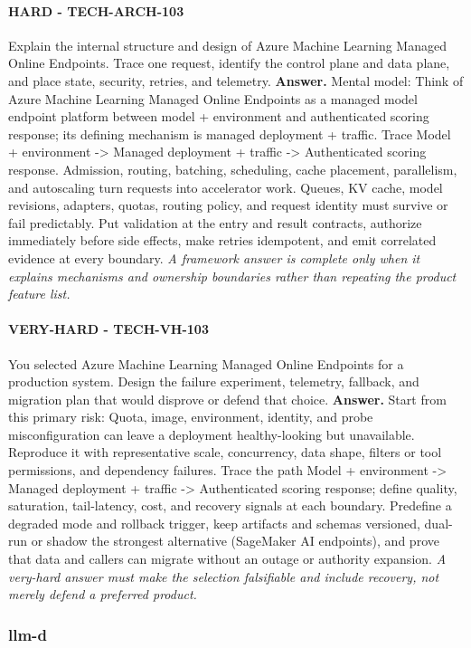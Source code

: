 \paragraph{HARD - TECH-ARCH-103} Explain the internal structure and design of Azure Machine Learning Managed Online Endpoints. Trace one request, identify the control plane and data plane, and place state, security, retries, and telemetry.
\textbf{Answer.} Mental model: Think of Azure Machine Learning Managed Online Endpoints as a managed model endpoint platform between model + environment and authenticated scoring response; its defining mechanism is managed deployment + traffic. Trace Model + environment -> Managed deployment + traffic -> Authenticated scoring response. Admission, routing, batching, scheduling, cache placement, parallelism, and autoscaling turn requests into accelerator work. Queues, KV cache, model revisions, adapters, quotas, routing policy, and request identity must survive or fail predictably. Put validation at the entry and result contracts, authorize immediately before side effects, make retries idempotent, and emit correlated evidence at every boundary.
\textit{A framework answer is complete only when it explains mechanisms and ownership boundaries rather than repeating the product feature list.}
\paragraph{VERY-HARD - TECH-VH-103} You selected Azure Machine Learning Managed Online Endpoints for a production system. Design the failure experiment, telemetry, fallback, and migration plan that would disprove or defend that choice.
\textbf{Answer.} Start from this primary risk: Quota, image, environment, identity, and probe misconfiguration can leave a deployment healthy-looking but unavailable. Reproduce it with representative scale, concurrency, data shape, filters or tool permissions, and dependency failures. Trace the path Model + environment -> Managed deployment + traffic -> Authenticated scoring response; define quality, saturation, tail-latency, cost, and recovery signals at each boundary. Predefine a degraded mode and rollback trigger, keep artifacts and schemas versioned, dual-run or shadow the strongest alternative (SageMaker AI endpoints), and prove that data and callers can migrate without an outage or authority expansion.
\textit{A very-hard answer must make the selection falsifiable and include recovery, not merely defend a preferred product.}
\subsubsection*{llm-d}
